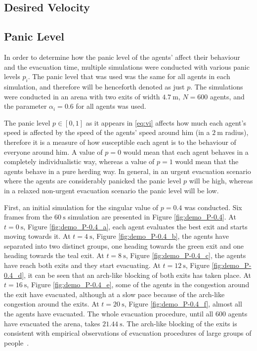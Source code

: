 \subsection{Desired Velocity}


\subsection{Panic Level}
In order to determine how the panic level of the agents' affect their behaviour and the evacuation time, multiple simulations were conducted with various panic levels $p_i$. The panic level that was used was the same for all agents in each simulation, and therefore will be henceforth denoted as just $p$. The simulations were conducted in an arena with two exits of width $\SI{4.7}{\meter}$, $N=600$ agents, and the parameter $\alpha_i=0.6$ for all agents was used.

The panic level $p \in [0,1]$ as it appears in \eqref{eq:vi} affects how much each agent's speed is affected by the speed of the agents' speed around him (in a $\SI{2}{\meter}$ radius), therefore it is a measure of how susceptible each agent is to the behaviour of everyone around him. A value of $p=0$ would mean that each agent behaves in a completely individualistic way, whereas a value of $p=1$ would mean that the agents behave in a pure herding way. In general, in an urgent evacuation scenario where the agents are considerably panicked the panic level $p$ will be high, whereas in a relaxed non-urgent evacuation scenario the panic level will be low.

First, an initial simulation for the singular value of $p = 0.4$ was conducted. Six frames from the $\SI{60}{\second}$ simulation are presented in Figure \ref{fig:demo_P-0.4}. At $t=\SI{0}{\second}$, Figure \ref{fig:demo_P-0.4_a}, each agent evaluates the best exit and starts moving towards it. At $t=\SI{4}{\second}$, Figure \ref{fig:demo_P-0.4_b}, the agents have separated into two distinct groups, one heading towards the green exit and one heading towards the teal exit. At $t=\SI{8}{\second}$, Figure \ref{fig:demo_P-0.4_c}, the agents have reach both exits and they start evacuating. At $t=\SI{12}{\second}$, Figure \ref{fig:demo_P-0.4_d}, it can be seen that an arch-like blocking of both exits has taken place. At $t=\SI{16}{\second}$, Figure \ref{fig:demo_P-0.4_e}, some of the agents in the congestion around the exit have evacuated, although at a slow pace because of the arch-like congestion around the exits. At $t=\SI{20}{\second}$, Figure \ref{fig:demo_P-0.4_f}, almost all the agents have evacuated. The whole evacuation procedure, until all $600$ agents have evacuated the arena, takes $\SI{21.44}{\second}$. The arch-like blocking of the exits is consistent with empirical observations of evacuation procedures of large groups of people~\cite{Helbing2000}.

